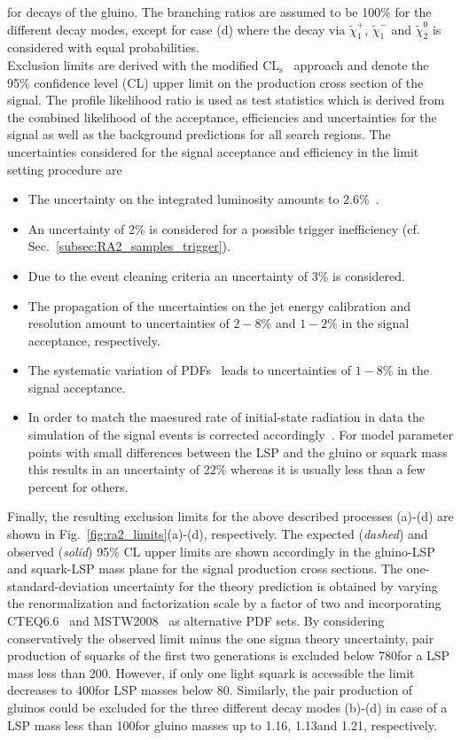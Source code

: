 for decays of the gluino. The branching ratios are assumed to be 100\% for the different decay modes, except for case (d) where the decay via $\tilde{\chi}_1^{+}$, $\tilde{\chi}_1^{-}$ and $\tilde{\chi}_2^0$ is considered with equal probabilities. \\
Exclusion limits are derived with the modified $\mathrm{CL_s}$~\cite{0954-3899-28-10-313, Thomas1999435, bib:Higgs:CLS} approach and denote the 95\% confidence level (CL) upper limit on the production cross section of the signal. The profile likelihood ratio is used as test statistics which is derived from the combined likelihood of the acceptance, efficiencies and uncertainties for the signal as well as the background predictions for all search regions. The uncertainties considered for the signal acceptance and efficiency in the limit setting procedure are 
\begin{itemize} 
\item The uncertainty on the integrated luminosity amounts to 2.6\%~\cite{CMS-PAS-LUM-13-001}.
\item An uncertainty of 2\% is considered for a possible trigger inefficiency (cf. Sec.~\ref{subsec:RA2_samples_trigger}).
\item Due to the event cleaning criteria an uncertainty of 3\% is considered.
\item The propagation of the uncertainties on the jet energy calibration and resolution amount to uncertainties of $2-8$\% and $1-2\%$ in the signal acceptance, respectively. 
\item The systematic variation of PDFs~\cite{Botje:2011sn} leads to uncertainties of $1-8$\% in the signal acceptance. 
\item In order to match the maesured rate of initial-state radiation in data the simulation of the signal events is corrected accordingly~\cite{isrfsr}. For model parameter points with small differences between the LSP and the gluino or squark mass this results in an uncertainty of 22\% whereas it is usually less than a few percent for others.  
\end{itemize}
Finally, the resulting exclusion limits for the above described processes (a)-(d) are shown in Fig.~\ref{fig:ra2_limits}(a)-(d), respectively. The expected (\textit{dashed}) and observed (\textit{solid}) 95\% CL upper limits are shown accordingly in the gluino-LSP and squark-LSP mass plane for the signal production cross sections. The one-standard-deviation uncertainty for the theory prediction is obtained by varying the renormalization and factorization scale by a factor of two and incorporating CTEQ6.6~\cite{Nadolsky:2008zw} and MSTW2008~\cite{Martin:2009iq} as alternative PDF sets. By considering conservatively the observed limit minus the one sigma theory uncertainty, pair production of squarks of the first two generations is excluded below 780\gev for a LSP mass less than 200\gev. However, if only one light squark is accessible the limit decreases to 400\gev for LSP masses below 80\gev. Similarly, the pair production of gluinos could be excluded for the three different decay modes (b)-(d) in case of a LSP mass less than 100\gev for gluino masses up to 1.16\tev, 1.13\tev and 1.21\tev, respectively. 


